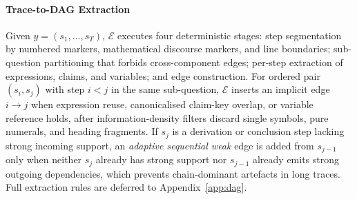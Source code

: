 \paragraph{Trace-to-DAG Extraction}
Given $y=(s_1,\dots,s_T)$, $\mathcal{E}$ executes four deterministic stages: step segmentation by numbered markers, mathematical discourse markers, and line boundaries; sub-question partitioning that forbids cross-component edges; per-step extraction of expressions, claims, and variables; and edge construction. For ordered pair $(s_i,s_j)$ with step $i<j$ in the same sub-question, $\mathcal{E}$ inserts an implicit edge $i\!\to\!j$ when expression reuse, canonicalised claim-key overlap, or variable reference holds, after information-density filters discard single symbols, pure numerals, and heading fragments.
If $s_j$ is a derivation or conclusion step lacking strong incoming support, an \emph{adaptive sequential weak} edge is added from $s_{j-1}$ only when neither $s_j$ already has strong support nor $s_{j-1}$ already emits strong outgoing dependencies, which prevents chain-dominant artefacts in long traces. Full extraction rules are deferred to Appendix~\ref{app:dag}.




